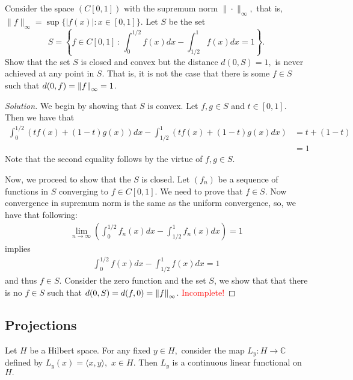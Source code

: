 \begin{exercise}
    Consider the space $\left( C[0,1] \right)$ with the supremum norm $\| \cdot\|_{\infty},$ that is, $\|f\|_{\infty}= \sup \big\{|f(x)| : x\in[0,1] \big \}.$ Let $S$ be the set
    \begin{equation*}
	S=\left\{ f \in C[0,1] \, : \, \int_{0}^{1/2} f\left( x \right) dx - \int_{1/2}^{1} f \left( x \right) dx =1 \right\}.
    \end{equation*}
    Show that the set $S$ is closed and convex but the distance $ d(0,S)=1,$ is never achieved at any point in $S$. That is, it is not the case that there is some $f\in S$ such that $d(0,f)= \left\lVert f \right\rVert_{\infty} = 1$.
\end{exercise}
\begin{proof}[Solution]
    We begin by showing that $S$ is convex. Let $f, g \in S$ and $t\in [0,1]$. Then we have that 
    \begin{align*}
	\int_{0}^{1/2} \left( t f\left( x \right) + \left( 1-t \right) g\left( x \right)\right) dx - \int_{1/2}^{1} \left( t f\left( x \right) + \left( 1-t \right) g\left( x \right) dx  \right) &= t + (1-t) \\
	&= 1
    \end{align*}
    Note that the second equality follows by the virtue of $f,g \in S$.

    Now, we proceed to show that the $S$ is closed. Let $\left( f_{n} \right) $ be a sequence of functions in $S$ converging to $f \in C\left[ 0,1 \right]$. We need to prove that $f \in S$. Now convergence in supremum norm is the same as the uniform convergence, so, we have that following:
    \begin{align*}
	\lim_{n\to \infty}\left( \int_{0}^{1/2} f_{n}\left( x \right) dx - \int_{1/2}^{1} f_{n} \left( x \right) dx \right) =1
    \end{align*}
    implies 
    \begin{align*}
\int_{0}^{1/2} f\left( x \right) dx - \int_{1/2}^{1} f \left( x \right) dx =1 
\end{align*}
and thus $f \in S$.
Consider the zero function and the set $S$, we show that that there is no $f \in S$ such that $d (0,S) = d(f,0)=\left\lVert f \right\rVert_{\infty}$. \textcolor{red}{Incomplete!}
\end{proof}

\subsection{Projections}
\begin{theorem}
Let $H$ be a Hilbert space. For any fixed $y\in H,$ consider the map $L_y : H \to \mathbb C$ defined by $L_y(x)= \langle x, y \rangle,\,\,x\in H.$ Then $L_y$ is a continuous linear functional on $H.$ 
    \label{thm:ip-linear-functional}
\end{theorem}


